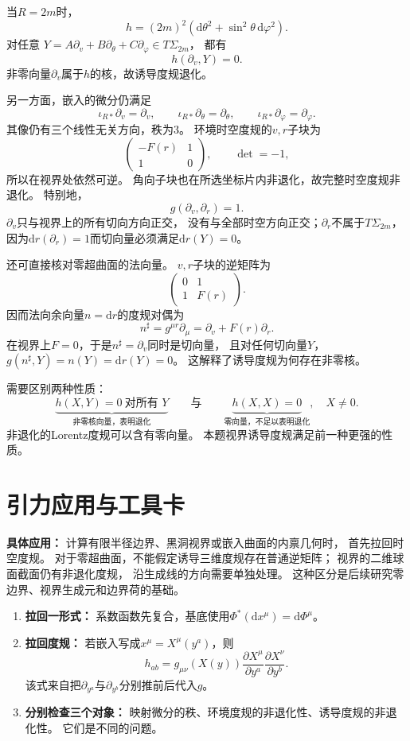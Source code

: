\documentclass[11pt,a4paper,fontset=fandol]{ctexart}
\newcommand{\dd}{\mathrm{d}}
\begin{document}
当$R=2m$时，
\[
 h=(2m)^2(\dd\theta^2+\sin^2\theta\,\dd\varphi^2).
\]
对任意
$Y=A\partial_v+B\partial_\theta+C\partial_\varphi\in T\Sigma_{2m}$，
都有
\[
 h(\partial_v,Y)=0.
\]
非零向量$\partial_v$属于$h$的核，故诱导度规退化。

另一方面，嵌入的微分仍满足
\[
 \iota_{R*}\partial_v=\partial_v,\qquad
 \iota_{R*}\partial_\theta=\partial_\theta,\qquad
 \iota_{R*}\partial_\varphi=\partial_\varphi.
\]
其像仍有三个线性无关方向，秩为$3$。
环境时空度规的$v,r$子块为
\[
 \begin{pmatrix}-F(r)&1\\1&0\end{pmatrix},
 \qquad \det=-1,
\]
所以在视界处依然可逆。
角向子块也在所选坐标片内非退化，故完整时空度规非退化。
特别地，
\[
 g(\partial_v,\partial_r)=1.
\]
$\partial_v$只与视界上的所有切向方向正交，
没有与全部时空方向正交；$\partial_r$不属于$T\Sigma_{2m}$，
因为$\dd r(\partial_r)=1$而切向量必须满足$\dd r(Y)=0$。

还可直接核对零超曲面的法向量。
$v,r$子块的逆矩阵为
\[
 \begin{pmatrix}0&1\\1&F(r)\end{pmatrix}.
\]
因而法向余向量$n=\dd r$的度规对偶为
\[
 n^\sharp=g^{\mu r}\partial_\mu=\partial_v+F(r)\partial_r.
\]
在视界上$F=0$，于是$n^\sharp=\partial_v$同时是切向量，
且对任何切向量$Y$，
$g(n^\sharp,Y)=n(Y)=\dd r(Y)=0$。
这解释了诱导度规为何存在非零核。

需要区别两种性质：
\[
 \underbrace{h(X,Y)=0\ \text{对所有 }Y}_{\text{非零核向量，表明退化}}
 \qquad\text{与}\qquad
 \underbrace{h(X,X)=0}_{\text{零向量，不足以表明退化}},
 \quad X\ne0.
\]
非退化的Lorentz度规可以含有零向量。
本题视界诱导度规满足前一种更强的性质。

\section{引力应用与工具卡}
\textbf{具体应用：}
计算有限半径边界、黑洞视界或嵌入曲面的内禀几何时，
首先拉回时空度规。
对于零超曲面，不能假定诱导三维度规存在普通逆矩阵；
视界的二维球面截面仍有非退化度规，
沿生成线的方向需要单独处理。
这种区分是后续研究零边界、视界生成元和边界荷的基础。

\begin{enumerate}[label=\textbf{\arabic*.}]
 \item \textbf{拉回一形式：}
 系数函数先复合，基底使用$\Phi^*(\dd x^\mu)=\dd\Phi^\mu$。
 \item \textbf{拉回度规：}
 若嵌入写成$x^\mu=X^\mu(y^a)$，则
 \[
 h_{ab}=g_{\mu\nu}(X(y))
 \frac{\partial X^\mu}{\partial y^a}
 \frac{\partial X^\nu}{\partial y^b}.
 \]
 该式来自把$\partial_{y^a}$与$\partial_{y^b}$分别推前后代入$g$。
 \item \textbf{分别检查三个对象：}
 映射微分的秩、环境度规的非退化性、诱导度规的非退化性。
 它们是不同的问题。
\end{enumerate}
\end{document}
